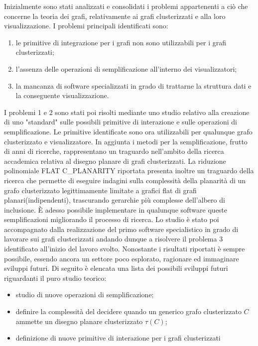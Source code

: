 \large{
Inizialmente sono stati analizzati e consolidati i problemi appartenenti a ciò che concerne la teoria dei grafi, relativamente ai grafi clusterizzati e alla loro visualizzazione. I problemi principali identificati sono:
\begin{enumerate}
	\item le primitive di integrazione per i grafi non sono utilizzabili per i grafi clusterizzati;
	\item l'assenza delle operazioni di semplificazione all'interno dei visualizzatori; 
	\item la mancanza di software specializzati in grado di trattarne la struttura dati e la conseguente visualizzazione.
\end{enumerate}  
I problemi 1 e 2 sono stati poi risolti mediante uno studio relativo alla creazione di uno "standard" sulle possibili primitive di interazione e sulle operazioni di semplificazione.
Le primitive identificate sono ora utilizzabili per qualunque grafo clusterizzato e visualizzatore. In aggiunta i metodi per la semplificazione, frutto di anni di ricerche, rappresentano un traguardo nell'ambito della ricerca accademica relativa al disegno planare di grafi clusterizzati. La riduzione polinomiale FLAT C\_PLANARITY riportata presenta inoltre un traguardo della ricerca che permette di eseguire indagini sulla complessità della planarità di un grafo clusterizzato legittimamente limitate a grafici flat di grafi planari(indipendenti), trascurando gerarchie più complesse dell'albero di inclusione.	
\newpage
È adesso possibile implementare in qualunque software queste semplificazioni migliorando il processo di ricerca. Lo studio è stato poi accompagnato dalla realizzazione del primo software specialistico in grado di lavorare sui grafi clusterizzati andando dunque a risolvere il problema 3 identificato all'inizio del lavoro svolto. Nonostante i risultati riportati è sempre possibile, essendo ancora un settore poco esplorato, ragionare ed immaginare sviluppi futuri. 
Di seguito è elencata una lista dei possibili sviluppi futuri riguardanti il puro studio teorico:
\begin{itemize}
	\item studio di nuove operazioni di semplificazione; 
	\item definire la complessità del decidere quando un generico grafo clusterizzato $C$ ammette un disegno planare clusterizzato $\tau(C)$;
	\item definizione di nuove primitive di interazione per i grafi clusterizzati
\end{itemize}

}
